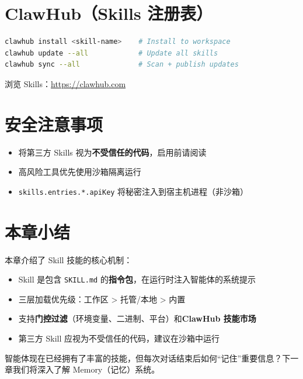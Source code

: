 \section{ClawHub（Skills 注册表）}

\begin{lstlisting}[language=bash]
clawhub install <skill-name>    # Install to workspace
clawhub update --all            # Update all skills
clawhub sync --all              # Scan + publish updates
\end{lstlisting}

浏览 Skills：\href{https://clawhub.com}{https://clawhub.com}

\section{安全注意事项}

\begin{itemize}
  \item 将第三方 Skills 视为\textbf{不受信任的代码}，启用前请阅读
  \item 高风险工具优先使用沙箱隔离运行
  \item \texttt{skills.entries.*.apiKey} 将秘密注入到宿主机进程（非沙箱）
\end{itemize}

\section{本章小结}

本章介绍了 Skill 技能的核心机制：

\begin{itemize}
  \item Skill 是包含 \texttt{SKILL.md} 的\textbf{指令包}，在运行时注入智能体的系统提示
  \item 三层加载优先级：工作区 > 托管/本地 > 内置
  \item 支持\textbf{门控过滤}（环境变量、二进制、平台）和\textbf{ClawHub 技能市场}
  \item 第三方 Skill 应视为不受信任的代码，建议在沙箱中运行
\end{itemize}

\noindent 智能体现在已经拥有了丰富的技能，但每次对话结束后如何“记住”重要信息？下一章我们将深入了解 Memory（记忆）系统。
